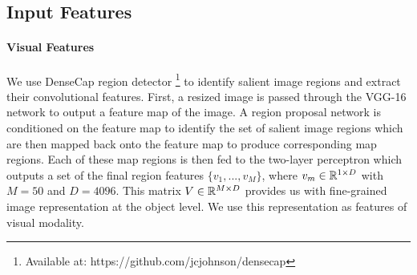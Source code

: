 \documentclass[11pt,a4paper]{article}
\newcommand{\kibitz}[2]{\ifnum\Comments=1\textcolor{#1}{#2}\fi}
\newcommand{\nikolai}[1]{\kibitz{red}  {[Nikolai: #1]}}
\newcommand{\R}{\mathbb{R}}
\begin{document}



\subsection{Input Features}

\paragraph{Visual Features}
We use DenseCap region detector \cite{densecap}\footnote{Available at: https://github.com/jcjohnson/densecap} to identify salient image regions and extract their convolutional features.
First, a resized image is passed through the VGG-16 network \cite{Simonyan2014} to output a feature map of the image.
A region proposal network is conditioned on the feature map to identify the set of salient image regions which are then mapped back onto the feature map to produce corresponding map regions.
Each of these map regions is then fed to the two-layer perceptron which outputs a set of the final region features ${\{v_1, ..., v_M\}}$, where $v_m \in \R\sp{1 \times D}$ with $M=50$ and $D=4096$.
This matrix $V \in \R\sp{M \times D}$ provides us with fine-grained image representation at the object level.
We use this representation as features of visual modality.
\end{document}
